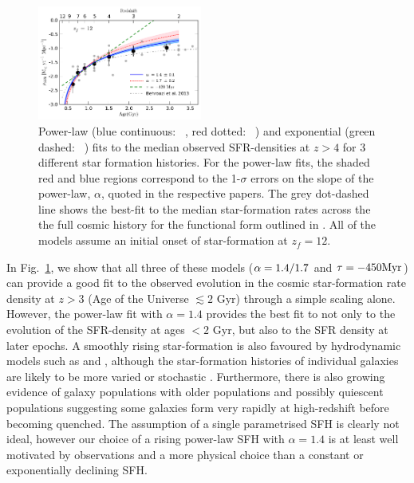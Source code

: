 \begin{figure}
    \centering
  \includegraphics[width=0.48\textwidth]{plots/Fig4.pdf}
  \caption{Power-law (blue continuous: \citeauthor{Salmon:2014tm}~\citeyear{Salmon:2014tm}, red dotted: \citeauthor{2011MNRAS.412.1123P}~\citeyear{2011MNRAS.412.1123P}) and exponential (green dashed: \citeauthor{2011MNRAS.412.1123P}~\citeyear{2011MNRAS.412.1123P}) fits to the median observed SFR-densities at $z > 4$ for 3 different star formation histories. For the power-law fits, the shaded red and blue regions correspond to the 1-$\sigma$ errors on the slope of the power-law, $\alpha$, quoted in the respective papers.  The grey dot-dashed line shows the best-fit to the median star-formation rates across the the full cosmic history for the functional form outlined in \citet{Behroozi:2013fg}. All of the models assume an initial onset of star-formation at $z_{f} = 12$.}
  \label{fig:SFH}
\end{figure}

In Fig.~\ref{fig:SFH}, we show that all three of these models ($\alpha \/ = \/ 1.4/1.7$ and $\tau = -450 \rm{Myr}$) can provide a good fit to the observed evolution in the cosmic star-formation rate density at $z > 3$ (Age of the Universe $\lesssim 2$ Gyr) through a simple scaling alone. However, the power-law fit with $\alpha = 1.4$ provides the best fit to not only to the evolution of the SFR-density at ages $< 2$ Gyr, but also to the SFR density at later epochs. A smoothly rising star-formation is also favoured by hydrodynamic models such as \citet{2011MNRAS.410.1703F} and \citet{Dayal:2013jm}, although the star-formation histories of individual galaxies are likely to be more varied or stochastic \citep{Dayal:2013jm,Kimm:2014gv}. Furthermore, there is also growing evidence of galaxy populations with older populations and possibly quiescent populations \citep{Nayyeri:2014cz,Spitler:2014ey} suggesting some galaxies form very rapidly at high-redshift before becoming quenched. The assumption of a single parametrised SFH is clearly not ideal, however our choice of a rising power-law SFH with $\alpha = 1.4$ is at least well motivated by observations and a more physical choice than a constant or exponentially declining SFH.
    
